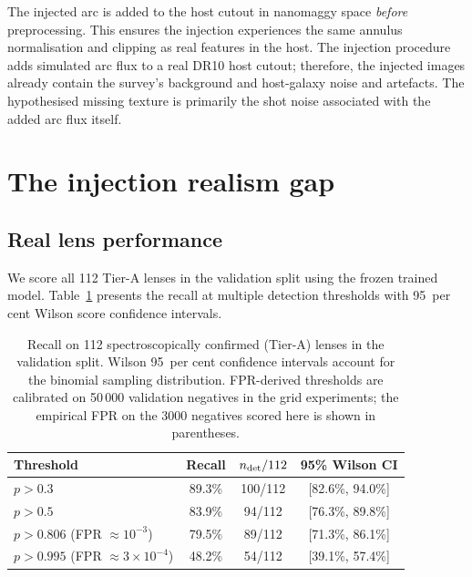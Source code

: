 \documentclass[fleqn,usenatbib]{mnras}
\begin{document}
The injected arc is added to the host cutout in nanomaggy space \emph{before} preprocessing.  This ensures the injection experiences the same annulus normalisation and clipping as real features in the host.  The injection procedure adds simulated arc flux to a real DR10 host cutout; therefore, the injected images already contain the survey's background and host-galaxy noise and artefacts.  The hypothesised missing texture is primarily the shot noise associated with the added arc flux itself.


\section{The injection realism gap}

\subsection{Real lens performance}

We score all 112 Tier-A lenses in the validation split using the frozen trained model.  Table~\ref{tab:tierA} presents the recall at multiple detection thresholds with 95~per cent Wilson score confidence intervals.

\begin{table}
\caption{Recall on 112 spectroscopically confirmed (Tier-A) lenses in the validation split.  Wilson 95~per cent confidence intervals account for the binomial sampling distribution.  FPR-derived thresholds are calibrated on 50\,000 validation negatives in the grid experiments; the empirical FPR on the 3000 negatives scored here is shown in parentheses.}
\label{tab:tierA}
\centering
\begin{tabular}{lccc}
\toprule
Threshold & Recall & $n_{\rm det}/112$ & 95\% Wilson CI \\
\midrule
$p > 0.3$ & 89.3\% & 100/112 & [82.6\%, 94.0\%] \\
$p > 0.5$ & 83.9\% & 94/112 & [76.3\%, 89.8\%] \\
$p > 0.806$ (FPR $\approx 10^{-3}$) & 79.5\% & 89/112 & [71.3\%, 86.1\%] \\
$p > 0.995$ (FPR $\approx 3 \times 10^{-4}$) & 48.2\% & 54/112 & [39.1\%, 57.4\%] \\
\bottomrule
\end{tabular}
\end{table}
\end{document}

